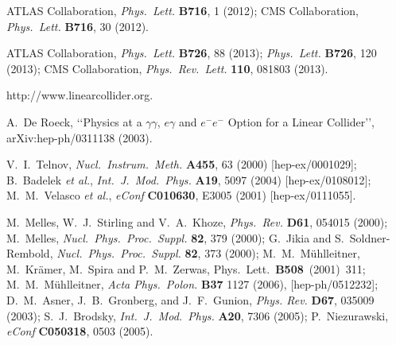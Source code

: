 \documentclass[final,5p,times,twocolumn]{elsarticle}
\begin{document}
\begin{thebibliography}{99}

ATLAS Collaboration, {\sl Phys.\ Lett.}  {\bf B716}, 1 (2012); 
CMS Collaboration, {\sl Phys.\ Lett.}  {\bf B716}, 30  (2012).

ATLAS Collaboration, {\sl Phys.\ Lett.}  {\bf B726}, 88  (2013); 
{\sl Phys.\ Lett.} {\bf B726}, 120  (2013); 
CMS Collaboration, {\sl Phys.\ Rev.\ Lett.}  {\bf 110}, 081803  (2013).

http://www.linearcollider.org.

A.~De Roeck,
\lq\lq Physics at a $\gamma\gamma$, $e\gamma$ and $e^-e^-$ Option for a Linear Collider\rq\rq,
arXiv:hep-ph/0311138 (2003). 

  V.~I.~Telnov,
  {\sl Nucl.\ Instrum.\ Meth.}  {\bf A455}, 63 (2000)
  [hep-ex/0001029]; 
 B.~Badelek {\it et al.},
  {\sl Int.\ J.\ Mod.\ Phys.}  {\bf A19}, 5097 (2004)
  [hep-ex/0108012]; 
 M.~M.~Velasco {\it et al.},
  {\sl eConf}  {\bf C010630}, E3005 (2001)
  [hep-ex/0111055].

  M.~Melles, W.~J.~Stirling and V.~A.~Khoze,
  {\sl Phys.\ Rev.}  {\bf D61}, 054015 (2000); 
 M.~Melles,
  {\sl Nucl.\ Phys.\ Proc.\ Suppl.} {\bf 82}, 379 (2000); 
 G.~Jikia and S.~Soldner-Rembold,
  {\sl Nucl.\ Phys.\ Proc.\ Suppl.}  {\bf 82}, 373 (2000); 
M.~M.~M{\"u}hlleitner, M.~Kr{\"a}mer, M.~Spira and P.~M.~Zerwas,
Phys.~Lett.~{\bf B508}~(2001)~311; 
M.~M.~M{\"u}hlleitner,
{\sl Acta Phys.\ Polon.} {\bf B37} 1127 (2006),  [hep-ph/0512232];
D.~M.~Asner, J.~B.~Gronberg, and J.~F.~Gunion, 
{\sl Phys. Rev.} {\bf D67}, 035009 (2003);
 S.~J.~Brodsky,
  {\sl Int.\ J.\ Mod.\ Phys.}  {\bf A20}, 7306 (2005); 
 P.~Niezurawski,
  {\sl eConf}  {\bf C050318}, 0503 (2005). 


\end{thebibliography}
\end{document}
